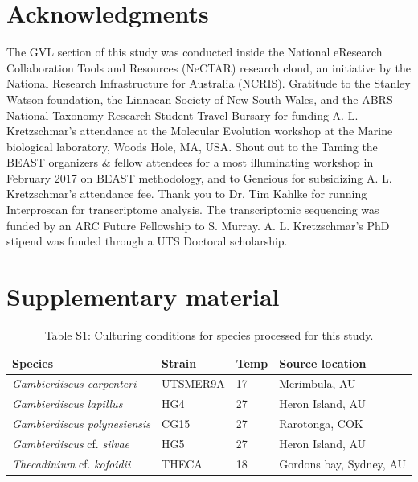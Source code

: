 \documentclass[12pt]{article}
\begin{document}
\section{Acknowledgments}
The GVL section of this study was conducted inside the National eResearch Collaboration Tools and Resources (NeCTAR) research cloud, an initiative by the National Research Infrastructure for Australia (NCRIS).
Gratitude to the Stanley Watson foundation, the Linnaean Society of New South Wales, and the ABRS National Taxonomy Research Student Travel Bursary for funding A. L. Kretzschmar's attendance at the Molecular Evolution workshop at the Marine biological laboratory, Woods Hole, MA, USA.
Shout out to the Taming the BEAST organizers \& fellow attendees for a most illuminating workshop in February 2017 on BEAST methodology, and to Geneious for subsidizing A. L. Kretzschmar's attendance fee.
Thank you to Dr. Tim Kahlke for running Interproscan for transcriptome analysis. 
The transcriptomic sequencing was funded by  an ARC Future Fellowship to S. Murray.
A. L. Kretzschmar's PhD stipend was funded through a UTS Doctoral scholarship.
\section{Supplementary material}
\FloatBarrier
\begin{table}
\caption{Table S1: Culturing conditions for species processed for this study.}
\begin{tabular}{ | p{3cm} | p{2.5cm} | p{1.5cm} | p{5.3cm} |}
\hline
\textbf{Species} & \textbf{Strain}& \textbf{Temp} & \textbf{Source location} \\
\hline
\textit{Gambierdiscus carpenteri}&UTSMER9A&17&Merimbula, AU\\
\hline
\textit{Gambierdiscus lapillus}&HG4&27&Heron Island, AU\\
\hline
\textit{Gambierdiscus polynesiensis}&CG15&27&Rarotonga, COK\\
\hline
\textit{Gambierdiscus} cf. \textit{silvae}&HG5&27&Heron Island, AU\\
\hline
\textit{Thecadinium} cf. \emph{kofoidii}&THECA&18&Gordons bay, Sydney, AU\\
\hline
\end{tabular}
\end{table}
\FloatBarrier
\end{document}
